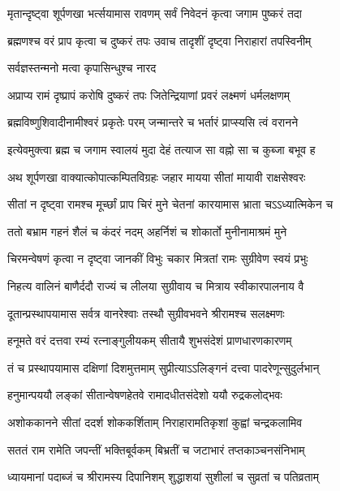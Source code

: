 \twolineshloka
{मृतान्दृष्ट्वा शूर्पणखा भर्त्सयामास रावणम्}
{सर्वं निवेदनं कृत्वा जगाम पुष्करं तदा}%


\twolineshloka
{ब्रह्मणश्च वरं प्राप कृत्वा च दुष्करं तपः}
{उवाच तादृशीं दृष्ट्वा निराहारां तपस्विनीम्}%

\onelineshloka
{सर्वज्ञस्तन्मनो मत्वा कृपासिन्धुश्च नारद}%


\twolineshloka
{अप्राप्य रामं दृष्प्रापं करोषि दुष्करं तपः}
{जितेन्द्रियाणां प्रवरं लक्ष्मणं धर्मलक्षणम्}%


\twolineshloka
{ब्रह्मविष्णुशिवादीनामीश्वरं प्रकृतेः परम्}
{जन्मान्तरे च भर्तारं प्राप्स्यसि त्वं वरानने}%


\twolineshloka
{इत्येवमुक्त्वा ब्रह्म च जगाम स्वालयं मुदा}
{देहं तत्याज सा वह्नो सा च कुब्जा बभूव ह}%


\twolineshloka
{अथ शूर्पणखा वाक्यात्कोपात्कम्पितविग्रहः}
{जहार मायया सीतां मायावी राक्षसेश्वरः}%


\twolineshloka
{सीतां न दृष्ट्वा रामश्च मूर्च्छां प्राप चिरं मुने}
{चेतनां कारयामास भ्राता चऽऽध्यात्मिकेन च}%


\twolineshloka
{ततो बभ्राम गहनं शैलं च कंदरं नदम्}
{अहर्निशं च शोकार्तो मुनीनामाश्रमं मुने}%


\twolineshloka
{चिरमन्वेषणं कृत्वा न दृष्ट्वा जानकीं विभुः}
{चकार मित्रतां रामः सुग्रीवेण स्वयं प्रभुः}%


\twolineshloka
{निहत्य वालिनं बाणैर्ददौ राज्यं च लीलया}
{सुग्रीवाय च मित्राय स्वीकारपालनाय वै}%


\twolineshloka
{दूतान्प्रस्थापयामास सर्वत्र वानरेश्वाः}
{तस्थौ सुग्रीवभवने श्रीरामश्च सलक्ष्मणः}%


\twolineshloka
{हनूमते वरं दत्तवा रम्यं रत्नाङ्गुलीयकम्}
{सीतायै शुभसंदेशं प्राणधारणकारणम्}%


\twolineshloka
{तं च प्रस्थापयामास दक्षिणां दिशमुत्तमाम्}
{सुप्रीत्याऽऽलिङ्गनं दत्त्वा पादरेणून्सुदुर्लभान्}%


\twolineshloka
{हनुमान्पययौ लङ्कां सीतान्वेषणहेतवे}
{रामादधीतसंदेशो ययौ रुद्रकलोद्भवः}%


\twolineshloka
{अशोककानने सीतां ददर्श शोककर्शिताम्}
{निराहारामतिकृशां कुह्वां चन्द्रकलामिव}%


\twolineshloka
{सततं राम रामेति जपन्तीं भक्तिबूर्वकम्}
{बिभ्रतीं च जटाभारं तप्तकाञ्चनसंनिभाम्}%


\twolineshloka
{ध्यायमानां पदाब्जं च श्रीरामस्य दिपानिशम्}
{शुद्धाशयां सुशीलां च सुव्रतां च पतिव्रताम्}%


